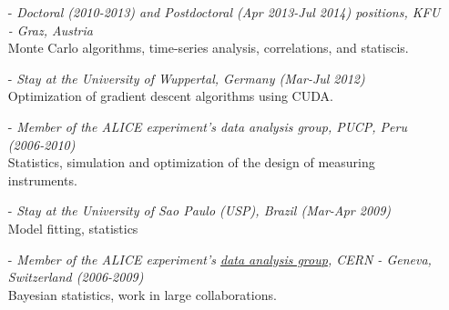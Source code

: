 \documentclass[a4paper, 10pt]{article}
\begin{document}
\vspace*{2mm}
\vspace*{-1mm}
\begin{itemize}
    \item[-] {\it Doctoral (2010-2013) and Postdoctoral (Apr 2013-Jul 2014) positions, KFU - Graz, Austria}
              \\Monte Carlo algorithms, time-series analysis, correlations, and statiscis.\vspace*{-1mm}
    \item[-] {\it Stay at the University of Wuppertal, Germany (Mar-Jul 2012)}
              \\Optimization of gradient descent algorithms using CUDA.\vspace*{-1mm}
    \item[-] {\it Member of the ALICE experiment's data analysis group,  PUCP, Peru (2006-2010)}
              \\Statistics, simulation and optimization of the design of measuring instruments.
    \item[-] {\it Stay at the University of Sao Paulo (USP), Brazil (Mar-Apr 2009)}
              \\Model fitting, statistics\vspace*{-1mm}
    \item[-] {\it Member of the ALICE experiment's \href{http://aliweb.cern.ch/Offline/}{data analysis group}, CERN - 
              Geneva, Switzerland (2006-2009)}
              \\Bayesian statistics, work in large collaborations.
\end{itemize}


\vspace*{2mm}
\end{document}
